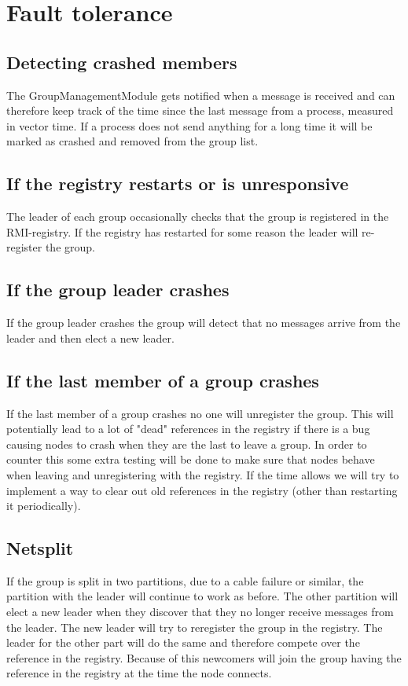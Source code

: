 \documentclass[english]{article}
\begin{document}
\section{Fault tolerance}

\subsection{Detecting crashed members}
The GroupManagementModule gets notified when a message is received and can therefore keep track of the time since the last message from a process, measured in vector time. If a process does not send anything for a long time it will be marked as crashed and removed from the group list.

\subsection{If the registry restarts or is unresponsive}
The leader of each group occasionally checks that the group is registered in the RMI-registry. If the registry has restarted for some reason the leader will re-register the group.

\subsection{If the group leader crashes}
If the group leader crashes the group will detect that no messages arrive from the leader and then elect a new leader. 

\subsection{If the last member of a group crashes}
If the last member of a group crashes no one will unregister the group.
This will potentially lead to a lot of "dead" references in the registry if there is a bug causing nodes to crash when they are the last to leave a group. In order to counter this some extra testing will be done to make sure that nodes behave when leaving and unregistering with the registry.
If the time allows we will try to implement a way to clear out old references in the registry (other than restarting it periodically).

\subsection{Netsplit}
If the group is split in two partitions, due to a cable failure or similar, the partition with the leader will continue to work as before. The other partition will elect a new leader when they discover that they no longer receive messages from the leader.
The new leader will try to reregister the group in the registry. The leader for the other part will do the same and therefore compete over the reference in the registry. Because of this newcomers will join the group having the reference in the registry at the time the node connects.
\end{document}
